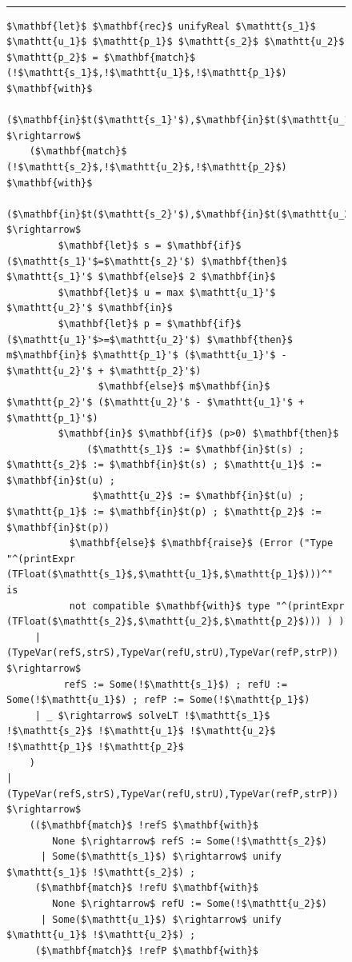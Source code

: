 
\begin{figure}[tb]
{\tt \small
\hrule
\vspace{0.2cm}
\begin{lstlisting}[mathescape]
$\mathbf{let}$ $\mathbf{rec}$ unifyReal $\mathtt{s_1}$ $\mathtt{u_1}$ $\mathtt{p_1}$ $\mathtt{s_2}$ $\mathtt{u_2}$ $\mathtt{p_2}$ = $\mathbf{match}$ (!$\mathtt{s_1}$,!$\mathtt{u_1}$,!$\mathtt{p_1}$) $\mathbf{with}$
  ($\mathbf{in}$t($\mathtt{s_1}'$),$\mathbf{in}$t($\mathtt{u_1}'$),$\mathbf{in}$t($\mathtt{p_1}'$)) $\rightarrow$  
    ($\mathbf{match}$ (!$\mathtt{s_2}$,!$\mathtt{u_2}$,!$\mathtt{p_2}$) $\mathbf{with}$
       ($\mathbf{in}$t($\mathtt{s_2}'$),$\mathbf{in}$t($\mathtt{u_2}'$),$\mathbf{in}$t($\mathtt{p_2}'$)) $\rightarrow$ 
         $\mathbf{let}$ s = $\mathbf{if}$ ($\mathtt{s_1}'$=$\mathtt{s_2}'$) $\mathbf{then}$ $\mathtt{s_1}'$ $\mathbf{else}$ 2 $\mathbf{in}$
         $\mathbf{let}$ u = max $\mathtt{u_1}'$ $\mathtt{u_2}'$ $\mathbf{in}$
         $\mathbf{let}$ p = $\mathbf{if}$ ($\mathtt{u_1}'$>=$\mathtt{u_2}'$) $\mathbf{then}$ m$\mathbf{in}$ $\mathtt{p_1}'$ ($\mathtt{u_1}'$ - $\mathtt{u_2}'$ + $\mathtt{p_2}'$) 
                $\mathbf{else}$ m$\mathbf{in}$ $\mathtt{p_2}'$ ($\mathtt{u_2}'$ - $\mathtt{u_1}'$ + $\mathtt{p_1}'$) 
         $\mathbf{in}$ $\mathbf{if}$ (p>0) $\mathbf{then}$ 
              ($\mathtt{s_1}$ := $\mathbf{in}$t(s) ; $\mathtt{s_2}$ := $\mathbf{in}$t(s) ; $\mathtt{u_1}$ := $\mathbf{in}$t(u) ; 
               $\mathtt{u_2}$ := $\mathbf{in}$t(u) ; $\mathtt{p_1}$ := $\mathbf{in}$t(p) ; $\mathtt{p_2}$ := $\mathbf{in}$t(p))
           $\mathbf{else}$ $\mathbf{raise}$ (Error ("Type "^(printExpr (TFloat($\mathtt{s_1}$,$\mathtt{u_1}$,$\mathtt{p_1}$)))^" is 
           not compatible $\mathbf{with}$ type "^(printExpr (TFloat($\mathtt{s_2}$,$\mathtt{u_2}$,$\mathtt{p_2}$))) ) )
     | (TypeVar(refS,strS),TypeVar(refU,strU),TypeVar(refP,strP)) $\rightarrow$ 
          refS := Some(!$\mathtt{s_1}$) ; refU := Some(!$\mathtt{u_1}$) ; refP := Some(!$\mathtt{p_1}$) 
     | _ $\rightarrow$ solveLT !$\mathtt{s_1}$ !$\mathtt{s_2}$ !$\mathtt{u_1}$ !$\mathtt{u_2}$ !$\mathtt{p_1}$ !$\mathtt{p_2}$ 
    )
| (TypeVar(refS,strS),TypeVar(refU,strU),TypeVar(refP,strP)) $\rightarrow$ 
    (($\mathbf{match}$ !refS $\mathbf{with}$
        None $\rightarrow$ refS := Some(!$\mathtt{s_2}$) 
      | Some($\mathtt{s_1}$) $\rightarrow$ unify $\mathtt{s_1}$ !$\mathtt{s_2}$) ;
     ($\mathbf{match}$ !refU $\mathbf{with}$
        None $\rightarrow$ refU := Some(!$\mathtt{u_2}$) 
      | Some($\mathtt{u_1}$) $\rightarrow$ unify $\mathtt{u_1}$ !$\mathtt{u_2}$) ; 
     ($\mathbf{match}$ !refP $\mathbf{with}$

\end{lstlisting}}
\end{figure}
